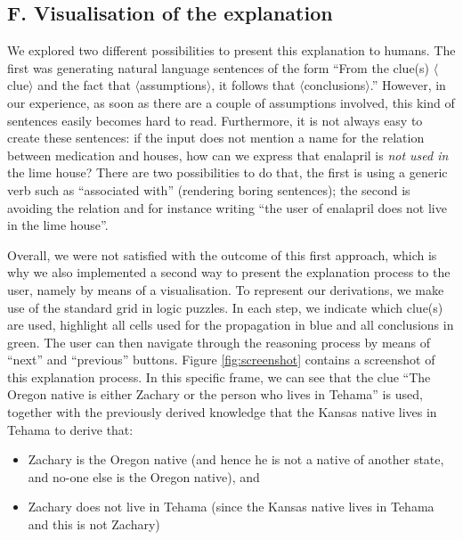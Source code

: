 \subsection{F. Visualisation of the explanation}
We explored two different possibilities to present this explanation to humans. 
The first was generating natural language sentences of the form 
``From the clue(s) $\langle$clue$\rangle$ and the fact that $\langle$assumptions$\rangle$, it follows that $\langle$conclusions$\rangle$.''
However, in our experience, as soon as there are a couple of assumptions involved, this kind of sentences easily becomes hard to read. Furthermore, it is not always easy to create these sentences: if the input does not mention a name for the relation between medication and houses, how can we express that enalapril is \emph{not used in} the lime house? 
There are two possibilities to do that, the first is using a generic verb such as ``associated with'' (rendering boring sentences); the second is avoiding the relation and for instance writing ``the user of enalapril does not live in the lime house''. 

Overall, we were not satisfied with the outcome of this first approach, which is why we also implemented a second way to present the explanation process to the user, namely by means of a visualisation. To represent our derivations, we make use of the standard grid in logic puzzles. In each step, we indicate which clue(s) are used, highlight all cells used for the propagation in blue and all conclusions in green. 
The user can then navigate through the reasoning process by means of ``next'' and ``previous'' buttons. 
Figure \ref{fig:screenshot} contains a screenshot of this explanation process. 
In this specific frame, we can see that the clue ``The Oregon native is either Zachary or the person who lives in Tehama'' is used, together with the previously derived knowledge that the Kansas native lives in Tehama to derive that:
\begin{itemize}
 \item Zachary is the Oregon native (and hence he is not a native of another state, and no-one else is the Oregon native), and
 \item Zachary does not live in Tehama (since the Kansas native lives in Tehama and this is not Zachary)
\end{itemize}

